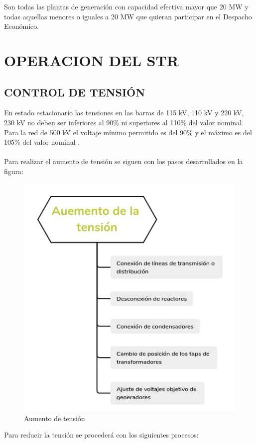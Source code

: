 \documentclass[a5paper]{book}%
\begin{document}
Son todas las plantas de generación con capacidad efectiva mayor que 20 MW y todas aquellas menores o iguales a 20 MW que quieran participar en el Despacho Económico. 


\part{OPERACION DEL STR}
  

\chapter{CONTROL DE TENSIÓN}

En estado estacionario las tensiones en las barras de 115 kV,
  110 kV y 220 kV, 230 kV no deben ser inferiores al 90\% ni
  superiores al 110\% del valor nominal. Para la red de 500 kV el
  voltaje mínimo permitido es del 90\% y el máximo es del 105\% del
  valor nominal \cite{CREG0251995}.\\\\

Para realizar el aumento de tensión se siguen con los pasos desarrollados en la figura:

\begin{figure}[H]
  \centering
  \caption{Aumento de tensión}
  \label{fig:aumentotension}
  \includegraphics[width=0.8\linewidth]{aumentartension}
\end{figure}

Para reducir la tensión se procederá con los siguientes procesos:
\end{document}

